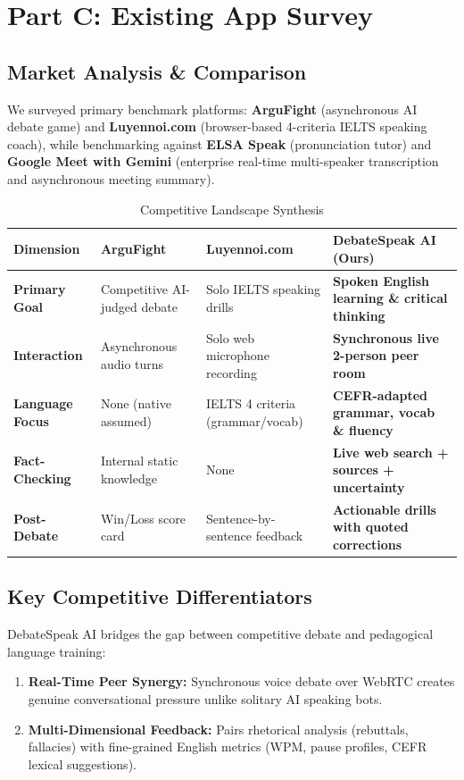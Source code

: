 \documentclass[11pt,a4paper]{article}
\begin{document}
\newpage

\section{Part C: Existing App Survey}
\subsection{Market Analysis \& Comparison}
We surveyed primary benchmark platforms: \textbf{ArguFight} (asynchronous AI debate game) and \textbf{Luyennoi.com} (browser-based 4-criteria IELTS speaking coach), while benchmarking against \textbf{ELSA Speak} (pronunciation tutor) and \textbf{Google Meet with Gemini} (enterprise real-time multi-speaker transcription and asynchronous meeting summary).

\begin{table}[h]
\centering
\footnotesize
\begin{tabularx}{\textwidth}{lXXX}
\toprule
\textbf{Dimension} & \textbf{ArguFight} & \textbf{Luyennoi.com} & \textbf{DebateSpeak AI (Ours)} \\
\midrule
\textbf{Primary Goal} & Competitive AI-judged debate & Solo IELTS speaking drills & \textbf{Spoken English learning \& critical thinking} \\
\textbf{Interaction} & Asynchronous audio turns & Solo web microphone recording & \textbf{Synchronous live 2-person peer room} \\
\textbf{Language Focus} & None (native assumed) & IELTS 4 criteria (grammar/vocab) & \textbf{CEFR-adapted grammar, vocab \& fluency} \\
\textbf{Fact-Checking} & Internal static knowledge & None & \textbf{Live web search + sources + uncertainty} \\
\textbf{Post-Debate} & Win/Loss score card & Sentence-by-sentence feedback & \textbf{Actionable drills with quoted corrections} \\
\bottomrule
\end{tabularx}
\caption{Competitive Landscape Synthesis}
\end{table}

\subsection{Key Competitive Differentiators}
DebateSpeak AI bridges the gap between competitive debate and pedagogical language training:
\begin{enumerate}[leftmargin=1.2cm]
    \item \textbf{Real-Time Peer Synergy:} Synchronous voice debate over WebRTC creates genuine conversational pressure unlike solitary AI speaking bots.
    \item \textbf{Multi-Dimensional Feedback:} Pairs rhetorical analysis (rebuttals, fallacies) with fine-grained English metrics (WPM, pause profiles, CEFR lexical suggestions).
\end{enumerate}
\end{document}
